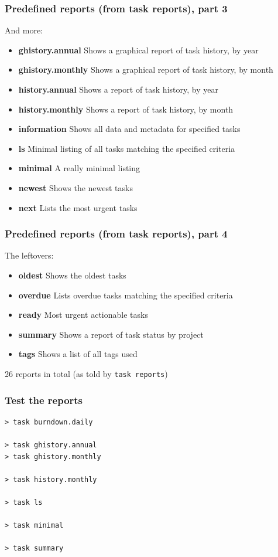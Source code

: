 \documentclass[t,handout,aspectratio=169]{beamer}
\begin{document}
\begin{frame}[fragile]\frametitle{Predefined reports (from task reports), part 3}
    \vfill
    And more:

    \begin{itemize}
        \item \textbf{ghistory.annual}  Shows a graphical report of task history, by year
        \item \textbf{ghistory.monthly} Shows a graphical report of task history, by month
        \item \textbf{history.annual}   Shows a report of task history, by year
        \item \textbf{history.monthly}  Shows a report of task history, by month
        \item \textbf{information}      Shows all data and metadata for specified tasks
        \item \textbf{ls}               Minimal listing of all tasks matching the specified criteria
        \item \textbf{minimal}          A really minimal listing
        \item \textbf{newest}           Shows the newest tasks
        \item \textbf{next}             Lists the most urgent tasks
    \end{itemize}
\end{frame}

\begin{frame}[fragile]\frametitle{Predefined reports (from task reports), part 4}
    \vfill
    The leftovers:

    \begin{itemize}
        \item \textbf{oldest}           Shows the oldest tasks
        \item \textbf{overdue}          Lists overdue tasks matching the specified criteria
        \item \textbf{ready}            Most urgent actionable tasks
        \item \textbf{summary}          Shows a report of task status by project
        \item \textbf{tags}             Shows a list of all tags used
    \end{itemize}

    26 reports in total (as told by \verb=task reports=)
\end{frame}

\begin{frame}[fragile]\frametitle{Test the reports}
    \vfill
    \begin{lstlisting}
> task burndown.daily

> task ghistory.annual
> task ghistory.monthly

> task history.monthly

> task ls

> task minimal

> task summary\end{lstlisting}
\end{frame}
\end{document}
